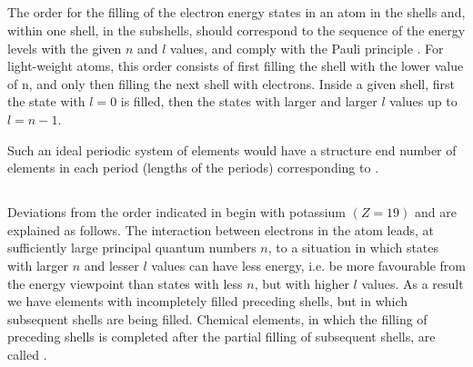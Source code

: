 \subsection{}\label{39.3.7} The order for the filling of the electron energy states in an atom in the shells and, within one shell, in the subshells, should correspond to the sequence of the energy levels with the given $n$ and $l$ values, and comply with the Pauli principle . For light-weight atoms, this order consists of first filling the shell with the lower value of n, and only then filling the next shell with electrons. Inside a given shell, first the state with $l = 0$ is filled, then the states with larger and larger $l$ values up to $l = n - 1$.

Such an ideal periodic system of elements would have a structure end number of elements in each period (lengths of the periods) corresponding to .

\subsection{}\label{39.3.8} Deviations from the order indicated in  begin with potassium $(Z = 19)$ and are explained as follows. The interaction between electrons in the atom leads, at sufficiently large principal quantum numbers $n$, to a situation in which states with larger $n$ and lesser $l$ values can have less energy, i.e. be more favourable from the energy viewpoint than states with less $n$, but with higher $l$ values. As a result we have elements with incompletely filled preceding shells, but in which subsequent shells are being filled. Chemical elements, in which the filling of preceding shells is completed after the partial filling of subsequent shells, are called .

